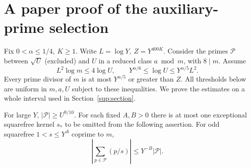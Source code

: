\section{A paper proof of the auxiliary-prime selection}\label{pr:sec}

Fix \(0<\alpha\le1/4,\ K\ge1\). Write \(L=\log Y,\ Z=Y^{400K}\).
Consider the primes \(\mathcal P\) between \(\sqrt U\) (excluded) and \(U\)
in a reduced class \(a\bmod m\), with \(8\mid m\). Assume
\[
 L^2\log m\le4\log U,\qquad
 Y^{\alpha/6}\le\log U\le Y^{\alpha/5}L^2 .
\]
Every prime divisor of \(m\) is at most \(Y^{\alpha/5}\) or greater than \(Z\).
All thresholds below are uniform in \(m,a,U\) subject to these inequalities.
We prove the estimates on a whole interval used in Section~\ref{sup:section}.

\begin{lemma}\label{pr:signs}
For large \(Y\), \(|\mathcal P|\ge U^{9/10}\). For each fixed \(A,B>0\)
there is at most one exceptional squarefree kernel \(s_*\) to be omitted
from the following assertion. For odd squarefree \(1<s\le Y^A\) coprime to \(m\),
\[
 \left|\sum_{p\in\mathcal P}(p/s)\right|\le Y^{-B}|\mathcal P| .
\]
\end{lemma}

